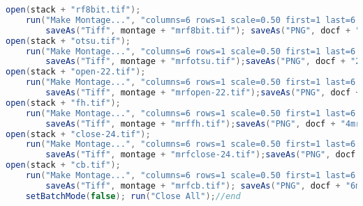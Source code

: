 \begin{lstlisting}[language=java, caption=Trainable segmentation on variable nest images., label=cd:threshold-variable-rf]
open(stack + "rf8bit.tif");
	run("Make Montage...", "columns=6 rows=1 scale=0.50 first=1 last=6 increment=1 border=4 font=20 label");
		saveAs("Tiff", montage + "mrf8bit.tif"); saveAs("PNG", docf + "1mrf.png");
open(stack + "otsu.tif");
	run("Make Montage...", "columns=6 rows=1 scale=0.50 first=1 last=6 increment=1 border=4 font=20 label");
		saveAs("Tiff", montage + "mrfotsu.tif");saveAs("PNG", docf + "2mrf.png");
open(stack + "open-22.tif");
	run("Make Montage...", "columns=6 rows=1 scale=0.50 first=1 last=6 increment=1 border=4 font=20 label");
		saveAs("Tiff", montage + "mrfopen-22.tif");saveAs("PNG", docf + "3mrf.png");
open(stack + "fh.tif"); 
	run("Make Montage...", "columns=6 rows=1 scale=0.50 first=1 last=6 increment=1 border=4 font=20 label");
		saveAs("Tiff", montage + "mrffh.tif");saveAs("PNG", docf + "4mrf.png");
open(stack + "close-24.tif");
	run("Make Montage...", "columns=6 rows=1 scale=0.50 first=1 last=6 increment=1 border=4 font=20 label");
		saveAs("Tiff", montage + "mrfclose-24.tif");saveAs("PNG", docf + "5mrf.png");
open(stack + "cb.tif");
	run("Make Montage...", "columns=6 rows=1 scale=0.50 first=1 last=6 increment=1 border=4 font=20 label");
		saveAs("Tiff", montage + "mrfcb.tif"); saveAs("PNG", docf + "6mrf.png");
	setBatchMode(false); run("Close All");//end
\end{lstlisting}



